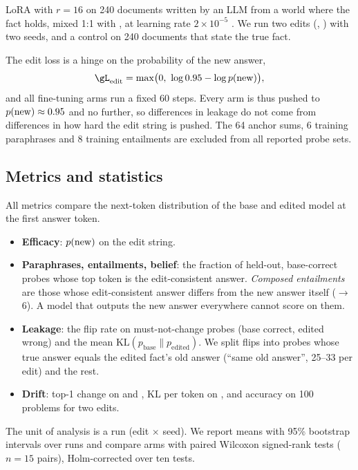  LoRA with $r=16$ on 240 documents written by an LLM from a world where the fact holds, mixed 1:1 with \wikitext, at learning rate $2\times10^{-5}$ \citep{wang2025sdf,slocum2025believe}.
We run two edits (, ) with two seeds, and a control on 240 documents that state the true fact.

The edit loss is a hinge on the probability of the new answer,
\begin{equation}
\gL_{\mathrm{edit}} = \max\bigl(0,\ \log 0.95 - \log \pnew\bigr),
\label{eq:hinge}
\end{equation}
and all fine-tuning arms run a fixed 60 steps.
Every arm is thus pushed to $p(\mathrm{new})\approx0.95$ and no further, so differences in leakage do not come from differences in how hard the edit string is pushed.
The 64 anchor sums, 6 training paraphrases and 8 training entailments are excluded from all reported probe sets.

\subsection{Metrics and statistics}
\label{sec:metrics}

All metrics compare the next-token distribution of the base and edited model at the first answer token.
\begin{itemize}[leftmargin=*,itemsep=0pt,topsep=0pt]
    \item \textbf{Efficacy}: $p(\mathrm{new})$ on the edit string.
    \item \textbf{Paraphrases, entailments, belief}: the fraction of held-out, base-correct probes whose top token is the edit-consistent answer. \emph{Composed entailments} are those whose edit-consistent answer differs from the new answer itself ($\to$6). A model that outputs the new answer everywhere cannot score on them.
    \item \textbf{Leakage}: the flip rate on must-not-change probes (base correct, edited wrong) and the mean $\mathrm{KL}(p_{\mathrm{base}}\|p_{\mathrm{edited}})$. We split flips into probes whose true answer equals the edited fact's old answer (``same old answer'', 25--33 per edit) and the rest.
    \item \textbf{Drift}: top-1 change on \counterfact \citep{meng2022rome} and \triviaqa \citep{joshi2017triviaqa}, KL per token on \wikitext \citep{merity2017wikitext}, and \gsm accuracy \citep{cobbe2021gsm8k} on 100 problems for two edits.
\end{itemize}

The unit of analysis is a run (edit $\times$ seed).
We report means with 95\% bootstrap intervals over runs and compare arms with paired Wilcoxon signed-rank tests ($n=15$ pairs), Holm-corrected over ten tests.
